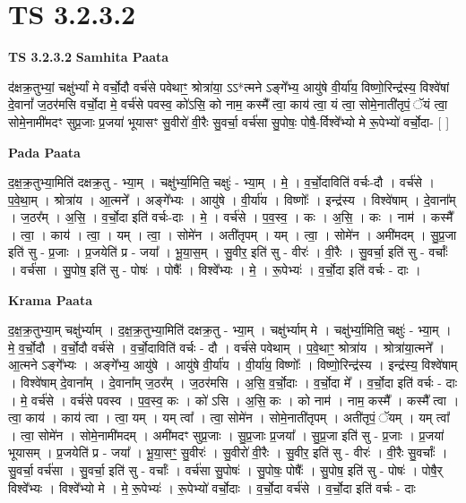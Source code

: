 \documentclass[17pt]{extarticle}
\begin{document}

\section{ TS 3.2.3.2 }

\textbf{TS 3.2.3.2 } \newline
\textbf{Samhita Paata} \newline

द॑क्षक्र॒तुभ्यां॒ चक्षु॑र्भ्यां मे वर्चो॒दौ वर्च॑से पवेथाꣳ॒॒ श्रोत्रा॑या॒ ऽऽ*त्मने ऽङ्गे᳚भ्य॒ आयु॑षे वी॒र्या॑य॒ विष्णो॒रिन्द्र॑स्य॒ विश्वे॑षां दे॒वानां᳚ ज॒ठर॑मसि वर्चो॒दा मे॒ वर्च॑से पवस्व॒ को॑ऽसि॒ को नाम॒ कस्मै᳚ त्वा॒ काय॑ त्वा॒ यं त्वा॒ सोमे॒नाती॑तृपं॒ ॅयं त्वा॒ सोमे॒नामी॑मदꣳ सुप्र॒जाः प्र॒जया॑ भूयासꣳ सु॒वीरो॑ वी॒रैः सु॒वर्चा॒ वर्च॑सा सु॒पोषः॒ पोषै॒-र्विश्वे᳚भ्यो मे रू॒पेभ्यो॑ वर्चो॒दा- [  ] \newline

\textbf{Pada Paata} \newline

द॒क्ष॒क्र॒तुभ्या॒मिति॑ दक्षक्र॒तु - भ्या॒म् । चक्षु॑र्भ्या॒मिति॒ चक्षुः॑ - भ्या॒म् । मे॒ । व॒र्चो॒दाविति॑ वर्चः-दौ । वर्च॑से । प॒वे॒था॒म् । श्रोत्रा॑य । आ॒त्मने᳚ । अङ्गे᳚भ्यः । आयु॑षे । वी॒र्या॑य । विष्णोः᳚ । इन्द्र॑स्य । विश्वे॑षाम् । दे॒वाना᳚म् । ज॒ठर᳚म् । अ॒सि॒ । व॒र्चो॒दा इति॑ वर्चः-दाः । मे॒ । वर्च॑से । प॒व॒स्व॒ । कः । अ॒सि॒ । कः । नाम॑ । कस्मै᳚ । त्वा॒ । काय॑ । त्वा॒ । यम् । त्वा॒ । सोमे॑न । अती॑तृपम् । यम् । त्वा॒ । सोमे॑न । अमी॑मदम् । सु॒प्र॒जा इति॑ सु - प्र॒जाः । प्र॒जयेति॑ प्र - जया᳚ । भू॒या॒स॒म् । सु॒वीर॒ इति॑ सु - वीरः॑ । वी॒रैः । सु॒वर्चा॒ इति॑ सु - वर्चाः᳚ । वर्च॑सा । सु॒पोष॒ इति॑ सु - पोषः॑ । पोषैः᳚ । विश्वे᳚भ्यः । मे॒ । रू॒पेभ्यः॑ । व॒र्चो॒दा इति॑ वर्चः - दाः ।  \newline


\textbf{Krama Paata} \newline

द॒क्ष॒क्र॒तुभ्या॒म् चक्षु॑र्भ्याम् । द॒क्ष॒क्र॒तुभ्या॒मिति॑ दक्षक्र॒तु - भ्या॒म् । चक्षु॑र्भ्याम् मे । चक्षु॑र्भ्या॒मिति॒ चक्षुः॑ - भ्या॒म् । मे॒ व॒र्चो॒दौ । व॒र्चो॒दौ वर्च॑से । व॒र्चो॒दाविति॑ वर्चः - दौ । वर्च॑से पवेथाम् । प॒वे॒थाꣳ॒॒ श्रोत्रा॑य । श्रोत्रा॑या॒त्मने᳚ । आ॒त्मने ऽङ्गे᳚भ्यः । अङ्गे᳚भ्य॒ आयु॑षे । आयु॑षे वी॒र्या॑य । वी॒र्या॑य॒ विष्णोः᳚ । विष्णो॒रिन्द्र॑स्य । इन्द्र॑स्य॒ विश्वे॑षाम् । विश्वे॑षाम् दे॒वाना᳚म् । दे॒वाना᳚म् ज॒ठर᳚म् । ज॒ठर॑मसि । अ॒सि॒ व॒र्चो॒दाः । व॒र्चो॒दा मे᳚ । व॒र्चो॒दा इति॑ वर्चः - दाः । मे॒ वर्च॑से । वर्च॑से पवस्व । प॒व॒स्व॒ कः । को॑ ऽसि । अ॒सि॒ कः । को नाम॑ । नाम॒ कस्मै᳚ । कस्मै᳚ त्वा । त्वा॒ काय॑ । काय॑ त्वा । त्वा॒ यम् । यम् त्वा᳚ । त्वा॒ सोमे॑न । सोमे॒नाती॑तृपम् । अती॑तृपं॒ ॅयम् । यम् त्वा᳚ । त्वा॒ सोमे॑न । सोमे॒नामी॑मदम् । अमी॑मदꣳ सुप्र॒जाः । सु॒प्र॒जाः प्र॒जया᳚ । सु॒प्र॒जा इति॑ सु - प्र॒जाः । प्र॒जया॑ भूयासम् । प्र॒जयेति॑ प्र - जया᳚ । भू॒या॒सꣳ॒॒ सु॒वीरः॑ । सु॒वीरो॑ वी॒रैः । सु॒वीर॒ इति॑ सु - वीरः॑ । वी॒रैः सु॒वर्चाः᳚ । सु॒वर्चा॒ वर्च॑सा । सु॒वर्चा॒ इति॑ सु - वर्चाः᳚ । वर्च॑सा सु॒पोषः॑ । सु॒पोषः॒ पोषैः᳚ । सु॒पोष॒ इति॑ सु - पोषः॑ । पोषै॒र् विश्वे᳚भ्यः । विश्वे᳚भ्यो मे । मे॒ रू॒पेभ्यः॑ । रू॒पेभ्यो॑ वर्चो॒दाः । व॒र्चो॒दा वर्च॑से । व॒र्चो॒दा इति॑ वर्चः - दाः \newline
\end{document}
